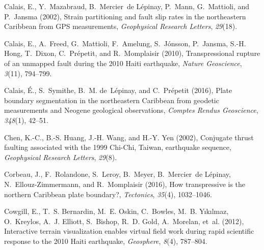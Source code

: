 \documentclass[linenumbers,draft]{agujournal}
\begin{document}
\begin{thebibliography}{62}
Calais, E., Y.~Mazabraud, B.~Mercier~de L{\'e}pinay, P.~Mann, G.~Mattioli, and
  P.~Jansma (2002), Strain partitioning and fault slip rates in the
  northeastern {Caribbean from GPS measurements}, \textit{Geophysical Research
  Letters}, \textit{29}(18).

Calais, E., A.~Freed, G.~Mattioli, F.~Amelung, S.~J{\'o}nsson, P.~Jansma, S.-H.
  Hong, T.~Dixon, C.~Pr{\'e}petit, and R.~Momplaisir (2010), Transpressional
  rupture of an unmapped fault during the 2010 {Haiti} earthquake,
  \textit{Nature Geoscience}, \textit{3}(11), 794--799.

Calais, {\'E}., S.~Symithe, B.~M. de~L{\'e}pinay, and C.~Pr{\'e}petit (2016),
  {Plate boundary segmentation in the northeastern Caribbean from geodetic
  measurements and Neogene geological observations}, \textit{Comptes Rendus
  Geoscience}, \textit{348}(1), 42--51.

Chen, K.-C., B.-S. Huang, J.-H. Wang, and H.-Y. Yen (2002), {Conjugate thrust
  faulting associated with the 1999 Chi-Chi, Taiwan, earthquake sequence},
  \textit{Geophysical Research Letters}, \textit{29}(8).

Corbeau, J., F.~Rolandone, S.~Leroy, B.~Meyer, B.~Mercier~de L{\'e}pinay,
  N.~Ellouz-Zimmermann, and R.~Momplaisir (2016), How transpressive is the
  northern {Caribbean plate boundary?}, \textit{Tectonics}, \textit{35}(4),
  1032--1046.

Cowgill, E., T.~S. Bernardin, M.~E. Oskin, C.~Bowles, M.~B. Y{\i}k{\i}lmaz,
  O.~Kreylos, A.~J. Elliott, S.~Bishop, R.~D. Gold, A.~Morelan, et~al. (2012),
  Interactive terrain visualization enables virtual field work during rapid
  scientific response to the 2010 {Haiti} earthquake, \textit{Geosphere},
  \textit{8}(4), 787--804.


\end{thebibliography}
\end{document}
